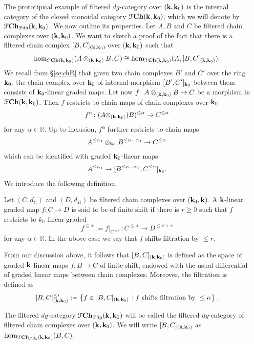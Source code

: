 The prototipical example of filtered $dg$-category over $(\mathbf{k},\mathbf{k}_0)$ is the internal category of the closed monoidal category $\mathcal{F} \mathbf{Ch}(\mathbf{k},\mathbf{k}_0)$, which we will denote by $\mathcal{F} \mathbf{Ch}_{\mathcal{F}dg}(\mathbf{k},\mathbf{k}_0)$. We now outline its properties.
Let $A,B$ and $C$ be filtered chain complexes over $(\mathbf{k},\mathbf{k}_0)$. We want to sketch a proof of the fact that there is a filtered chain complex $[B,C]_{(\mathbf{k},\mathbf{k}_0)}$ over $(\mathbf{k},\mathbf{k}_0)$ such that $$\hom_{\mathcal{F} \mathbf{Ch}(\mathbf{k},\mathbf{k}_0)}(A\otimes_{(\mathbf{k},\mathbf{k}_0)}B,C)\cong \hom_{\mathcal{F} \mathbf{Ch}(\mathbf{k},\mathbf{k}_0)}(A,[B,C]_{(\mathbf{k},\mathbf{k}_0)}).$$
We recall from \S\ref{se:chR} that given two chain complexes $B'$ and $C'$ over the ring $\mathbf{k}_0$, the chain complex over $\mathbf{k}_0$ of internal morphism $[B',C']_{\mathbf{k}_0}$ between them consists of $\mathbf{k}_0$-linear graded maps. Let now $f\colon A\otimes_{(\mathbf{k},\mathbf{k}_0)}B\to C$ be a morphism in $\mathcal{F} \mathbf{Ch}(\mathbf{k},\mathbf{k}_0)$. Then $f$ restricts to chain maps of chain complexes over $\mathbf{k}_0$ $$f^\alpha\colon (A\otimes_{(\mathbf{k},\mathbf{k}_0)})B)^{\leq\alpha}\to C^{\leq\alpha}$$ for any $\alpha\in \mathbb{R}$. Up to inclusion, $f^\alpha$ further restricts to chain maps $$A^{\leq\alpha_1}\otimes_{\mathbf{k}_0}B^{\leq \alpha-\alpha_1}\to C^{\leq\alpha}$$ which can be identified with graded $\mathbf{k}_0$-linear maps $$A^{\leq\alpha_1}\to [B^{\leq\alpha-\alpha_1},C^{\leq\alpha}]_{\mathbf{k}_0}.$$ 
We introduce the following definition.
\begin{dfn}
    Let $(C,d_C)$ and $(D,d_D)$ be filtered chain complexes over $(\mathbf{k}_0,\mathbf{k})$. A $\mathbf{k}$-linear graded map $f\colon C\to D$ is said to be of finite shift if there is $r\geq 0$ such that $f$ restricts to $k_0$-linear graded $$f^{\leq\alpha}:=f\vert_{C^{\leq\alpha}}\colon C^{\leq\alpha}\to D^{\leq\alpha+r}$$ for any $\alpha\in \mathbb{R}$. In the above case we say that $f$ shifts filtration by $\leq r$.
\end{dfn}
From our discussion above, it follows that $[B,C]_{(\mathbf{k},\mathbf{k}_0)}$ is defined as the space of graded $\mathbf{k}$-linear maps $f\colon B\to C$ of finite shift, endowed with the usual differential of graded linear maps between chain complexes. Moreover, the filtration is defined as $$[B,C]_{(\mathbf{k},\mathbf{k}_0)}^{\leq r}:= \left\{f\in [B,C]_{(\mathbf{k},\mathbf{k}_0)} \ | \ f\text{ shifts filtration by }\leq\alpha\right\}.$$

The filtered $dg$-category $\mathcal{F} \mathbf{Ch}_{\mathcal{F}dg}(\mathbf{k},\mathbf{k}_0)$ will be called the filtered $dg$-category of filtered chain complexes over $(\mathbf{k},\mathbf{k}_0)$. We will write $[B,C]_{(\mathbf{k},\mathbf{k}_0)}$ as $\hom_{\mathcal{F} \mathbf{Ch}_{\mathcal{F}dg}(\mathbf{k},\mathbf{k}_0)}(B,C)$.

